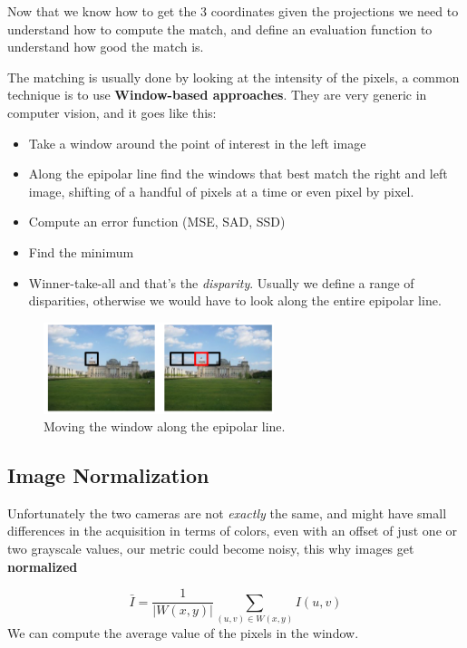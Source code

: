 Now that we know how to get the 3 coordinates given the projections we need to understand how to compute the match, and define an evaluation function to understand how good the match is. 

The matching is usually done by looking at the intensity of the pixels, a common technique is to use \textbf{Window-based approaches}. They are very generic in computer vision, and it goes like this:

\begin{itemize}
    \item Take a window around the point of interest in the left image
    \item Along the epipolar line find the windows that best match the right and left image, shifting of a handful of pixels at a time or even pixel by pixel.
    \item Compute an error function (MSE, SAD, SSD)
    \item Find the minimum
    \item Winner-take-all and that's the \textit{disparity}. Usually we define a range of disparities, otherwise we would have to look along the entire epipolar line.
\end{itemize}

\begin{figure}[H]
    \centering
    \includegraphics[width=0.6\textwidth]{Figures/sad.png}
    \caption{Moving the window along the epipolar line.}
    \label{fig:sad}
\end{figure}



\subsection{Image Normalization}

Unfortunately the two cameras are not \textit{exactly} the same, and might have small differences in the acquisition in terms of colors, even with an offset of just one or two grayscale values, our metric could become noisy, this why images get \textbf{normalized}


\begin{multicols}{2}
\[
\bar{I} = \frac{1}{|W(x,y)|} \sum_{(u,v) \in W(x,y)} I(u,v)
\]
We can compute the average value of the pixels in the window.

\end{multicols}

